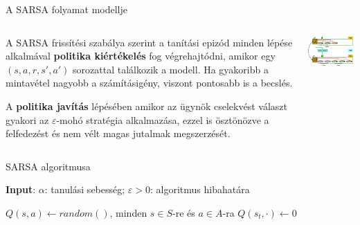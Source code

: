 \documentclass[english, aspectratio=169]{beamer}
\begin{document}
\begin{frame}{A SARSA folyamat modellje}
\begin{columns}
\begin{column}{.5\textwidth}
A SARSA frissítési szabálya szerint a tanítási epizód minden lépése alkalmával \textbf{politika kiértékelés} fog végrehajtódni, amikor egy $(s,a,r,s',a')$ sorozattal találkozik a modell. Ha gyakoribb a mintavétel nagyobb a számításigény, viszont pontosabb is a becslés.\par\smallskip
A \textbf{politika javítás} lépésében amikor az ügynök cselekvést választ gyakori az $\varepsilon$-mohó stratégia alkalmazása, ezzel is ösztönözve a felfedezést és nem vélt magas jutalmak megszerzését.
\end{column}
\begin{column}{.5\textwidth}
\begin{center}
\includegraphics[width=7cm, keepaspectratio]{images/mc_td_10.png}
\end{center}
\end{column}
\end{columns}
\end{frame}

\begin{frame}{SARSA algoritmusa}
\begin{algorithm}[H]
\caption{SARSA algoritmus $Q \approx q_*$ megbecslésére}
\SetAlgoLined
\textbf{Input}: $\alpha$: tanulási sebesség; $\varepsilon > 0$: algoritmus hibahatára\par\smallskip
$Q(s,a) \leftarrow random()$, minden $s \in S$-re és $a \in A$-ra\;
$Q(s_t,\cdot) \leftarrow 0$
\end{algorithm}
\end{frame}
\end{document}
